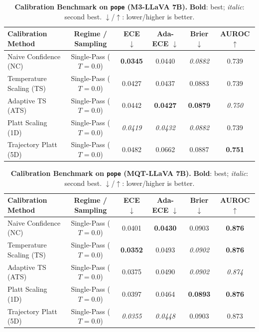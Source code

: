 \begin{table}[t]
\setlength{\tabcolsep}{4pt}
\renewcommand{\arraystretch}{1.05}
\centering
\footnotesize
\begin{tabular}{lccccc}
\toprule
\textbf{Calibration Method} & \textbf{Regime / Sampling} & \textbf{ECE} $\downarrow$ & \textbf{Ada-ECE} $\downarrow$ & \textbf{Brier} $\downarrow$ & \textbf{AUROC} $\uparrow$ \\
\midrule
Naive Confidence (NC) & Single-Pass ($T = 0.0$) & \textbf{0.0345} & 0.0440 & \textit{0.0882} & 0.739 \\
Temperature Scaling (TS) & Single-Pass ($T = 0.0$) & 0.0427 & 0.0437 & 0.0883 & 0.739 \\
Adaptive TS (ATS) & Single-Pass ($T = 0.0$) & 0.0442 & \textbf{0.0427} & \textbf{0.0879} & \textit{0.750} \\
Platt Scaling (1D) & Single-Pass ($T = 0.0$) & \textit{0.0419} & \textit{0.0432} & \textit{0.0882} & 0.739 \\
Trajectory Platt (5D) & Single-Pass ($T = 0.0$) & 0.0482 & 0.0662 & 0.0887 & \textbf{0.751} \\
\bottomrule
\end{tabular}
\caption{\textbf{Calibration Benchmark on \texttt{pope} (M3-LLaVA 7B).} \textbf{Bold}: best; \textit{italic}: second best. $\downarrow$/$\uparrow$: lower/higher is better.}
\label{tab:benchmark_m3_pope}
\end{table}

\begin{table}[t]
\setlength{\tabcolsep}{4pt}
\renewcommand{\arraystretch}{1.05}
\centering
\footnotesize
\begin{tabular}{lccccc}
\toprule
\textbf{Calibration Method} & \textbf{Regime / Sampling} & \textbf{ECE} $\downarrow$ & \textbf{Ada-ECE} $\downarrow$ & \textbf{Brier} $\downarrow$ & \textbf{AUROC} $\uparrow$ \\
\midrule
Naive Confidence (NC) & Single-Pass ($T = 0.0$) & 0.0401 & \textbf{0.0430} & 0.0903 & \textbf{0.876} \\
Temperature Scaling (TS) & Single-Pass ($T = 0.0$) & \textbf{0.0352} & 0.0493 & \textit{0.0902} & \textbf{0.876} \\
Adaptive TS (ATS) & Single-Pass ($T = 0.0$) & 0.0375 & 0.0490 & \textit{0.0902} & \textit{0.874} \\
Platt Scaling (1D) & Single-Pass ($T = 0.0$) & 0.0397 & 0.0464 & \textbf{0.0893} & \textbf{0.876} \\
Trajectory Platt (5D) & Single-Pass ($T = 0.0$) & \textit{0.0355} & \textit{0.0448} & 0.0903 & 0.873 \\
\bottomrule
\end{tabular}
\caption{\textbf{Calibration Benchmark on \texttt{pope} (MQT-LLaVA 7B).} \textbf{Bold}: best; \textit{italic}: second best. $\downarrow$/$\uparrow$: lower/higher is better.}
\label{tab:benchmark_mqt_pope}
\end{table}
